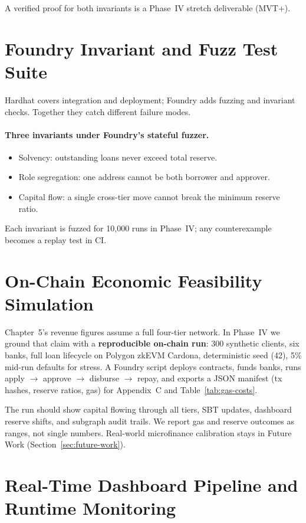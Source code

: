 \documentclass[12pt, a4paper]{report}
\begin{document}
A verified proof for both invariants is a Phase~IV stretch deliverable (MVT+).

\section{Foundry Invariant and Fuzz Test Suite}
\label{sec:foundry}

Hardhat covers integration and deployment; Foundry adds fuzzing and invariant checks. Together they catch different failure modes.

\paragraph{Three invariants under Foundry's stateful fuzzer.}
\begin{itemize}[noitemsep]
\item Solvency: outstanding loans never exceed total reserve.
\item Role segregation: one address cannot be both borrower and approver.
\item Capital flow: a single cross-tier move cannot break the minimum reserve ratio.
\end{itemize}

Each invariant is fuzzed for 10{,}000 runs in Phase~IV; any counterexample becomes a replay test in CI.

\section{On-Chain Economic Feasibility Simulation}
\label{sec:abm-sim}

Chapter~5's revenue figures assume a full four-tier network. In Phase~IV we ground that claim with a \textbf{reproducible on-chain run}: 300 synthetic clients, six banks, full loan lifecycle on Polygon zkEVM Cardona, deterministic seed (42), 5\% mid-run defaults for stress. A Foundry script deploys contracts, funds banks, runs apply $\to$ approve $\to$ disburse $\to$ repay, and exports a JSON manifest (tx hashes, reserve ratios, gas) for Appendix~C and Table~\ref{tab:gas-costs}.

The run should show capital flowing through all tiers, SBT updates, dashboard reserve shifts, and subgraph audit trails. We report gas and reserve outcomes as ranges, not single numbers. Real-world microfinance calibration stays in Future Work (Section~\ref{sec:future-work}).

\section{Real-Time Dashboard Pipeline and Runtime Monitoring}
\label{sec:realtime}
\end{document}
